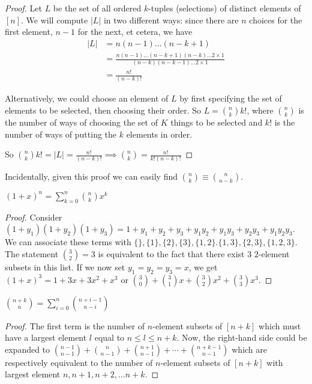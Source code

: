 \documentclass[12pt]{article}
\begin{document}
\begin{proof}
Let $L$ be the set of all ordered $k$-tuples (selections) of distinct elements of $[n]$. We will compute $|L|$ in two different ways: since there are $n$ choices for the first element, $n-1$ for the next, et cetera, we have
\begin{align*}
|L| &= n(n-1)\dots(n-k+1)\\
&= \frac{n(n-1)\dots(n-k+1)(n-k)\dots2 \times 1}{(n-k)(n-k-1)\dots2 \times 1}\\
&= \frac{n!}{(n-k)!}
\end{align*}

Alternatively, we could choose an element of $L$ by first specifying the set of elements to be selected, then choosing their order. So $L = {n \choose k} k!$, where ${n \choose k}$ is the number of ways of choosing the set of $K$ things to be selected and $k!$ is the number of ways of putting the $k$ elements in order.

So ${n \choose k} k! = |L| = \frac{n!}{(n-k)!} \implies {n \choose k} = \frac{n!}{k!(n-k)!}$
\end{proof}

Incidentally, given this proof we can easily find ${n \choose k} \equiv {n \choose n-k}$.

\begin{theorem}
${(1 + x)}^n = \sum_{k=0}^n {n \choose k} x^k$
\end{theorem}

\begin{proof}
Consider $(1 + y_1)(1 + y_2)(1 + y_3) = 1 + y_1 + y_2 + y_3 + y_1y_2 + y_1y_3 + y_2y_3 + y_1y_2y_3$. We can associate these terms with $\{\}, \{1\}, \{2\}, \{3\}, \{1,2\}. \{1,3\}, \{2,3\}, \{1,2,3\}$. The statement ${3 \choose 2} = 3$ is equivalent to the fact that there exist $3$ $2$-element subsets in this list. If we now set $y_1 = y_2 = y_3 = x$, we get ${(1 + x)}^3 = 1 + 3x + 3x^2 + x^3$ or ${3 \choose 0} + {3 \choose 1}x + {3 \choose 2}x^2 + {3 \choose 3}x^3$.
\end{proof}

\begin{lemma}
$\displaystyle{n + k \choose n} = \sum_{i=0}^n {n + i - 1 \choose n - i}$
\end{lemma}

\begin{proof}
The first term is the number of $n$-element subsets of $[n+k]$ which must have a largest element $l$ equal to $n \leq l \leq n+k$. Now, the right-hand side could be expanded to ${n-1 \choose n-1} + {n \choose n-1} + {n+1 \choose n-1} + \cdots + {n + k -1 \choose n-1}$ which are respectively equivalent to the number of $n$-element subsets of $[n+k]$ with largest element $n, n+1, n+2, \dots n+k$.
\end{proof}
\end{document}

